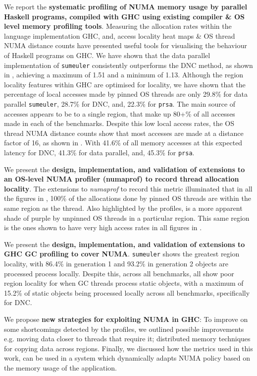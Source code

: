 \documentclass{paper}\usepackage{graphicx}
\begin{document}
We report the \textbf{systematic profiling of NUMA memory usage by parallel Haskell programs, compiled with  GHC using existing compiler \& OS level memory profiling tools}. Measuring the allocation rates within the language implementation GHC, and, access locality heat maps \& OS thread NUMA distance counts have presented useful tools for visualising the behaviour of Haskell programs on GHC. We have shown that the data parallel implementation of \lstinline{sumeuler} consistently outperforms the DNC method, as shown in , achieving a maximum of 1.51 and a minimum of 1.13. Although the region locality features within GHC are optimised for locality, we have shown that the percentage of local accesses made by pinned OS threads are only 29.8\% for data parallel \lstinline{sumeuler}, 28.7\% for DNC, and, 22.3\% for \lstinline{prsa}. The main source of accesses appears to be to a single region, that make up 80+\% of all accesses made in each of the benchmarks. Despite this low local access rates, the OS thread NUMA distance counts show that most accesses are made at a distance factor of 16, as shown in . With 41.6\% of all memory accesses at this expected latency for DNC, 41.3\% for data parallel, and, 45.3\% for \lstinline{prsa}.

We present the \textbf{design, implementation, and validation of extensions to an OS-level NUMA profiler (numaprof) to record thread allocation locality}. The extensions to \textit{numaprof} to record this metric illuminated that in all the figures in , 100\% of the allocations done by pinned OS threads are within the same region as the thread. Also highlighted by the profiles, is a more apparent shade of purple by unpinned OS threads in a particular region. This same region is the ones shown to have very high access rates in all figures in .

We present the \textbf{design, implementation, and validation of extensions to GHC GC profiling to cover NUMA}. \lstinline{sumeuler} shows the greatest region locality, with 86.4\% in generation 1 and 93.2\% in generation 2 objects are processed process locally. Despite this, across all benchmarks, all show poor region locality for when GC threads process static objects, with a maximum of 15.2\% of static objects being processed locally across all benchmarks, specifically for DNC.

We propose \textbf{new strategies for exploiting NUMA in GHC}:
To improve on some shortcomings detected by the profiles, we outlined possible improvements e.g. moving data closer to threads that require it; distributed memory techniques for copying data across regions. Finally, we discussed how the metrics used in this work, can be used in a system which dynamically adapts NUMA policy based on the memory usage of the application.
\end{document}
